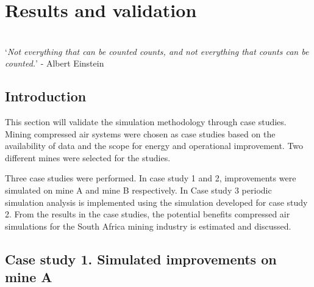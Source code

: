 \chapter{Results and validation}
\thispagestyle{empty}
\vspace{38em}
\hrulefill
\\


\enquote*{\textit{Not everything that can be counted counts, and not everything that counts can be counted.}} - Albert Einstein\\
\newpage
\section{Introduction}
This section will validate the simulation methodology through case studies. Mining compressed air systems were chosen as case studies based on the availability of data and the scope for energy and operational improvement. Two different mines were selected for the studies. 
\par 
Three case studies were performed. In case study 1 and 2, improvements were simulated on mine A and mine B respectively. In Case study 3 periodic simulation analysis is implemented using the simulation developed for case study 2. From the results in the case studies, the potential benefits compressed air simulations for the South Africa mining industry is estimated and discussed.

\section{Case study 1. Simulated improvements on mine A}
